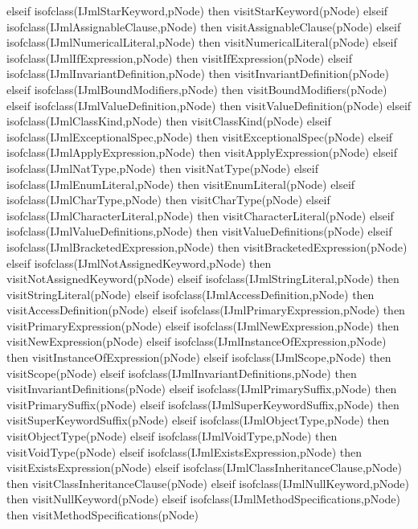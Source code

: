 \begin{vdm_al}
      elseif isofclass(IJmlStarKeyword,pNode) then visitStarKeyword(pNode)
      elseif isofclass(IJmlAssignableClause,pNode) then visitAssignableClause(pNode)
      elseif isofclass(IJmlNumericalLiteral,pNode) then visitNumericalLiteral(pNode)
      elseif isofclass(IJmlIfExpression,pNode) then visitIfExpression(pNode)
      elseif isofclass(IJmlInvariantDefinition,pNode) then visitInvariantDefinition(pNode)
      elseif isofclass(IJmlBoundModifiers,pNode) then visitBoundModifiers(pNode)
      elseif isofclass(IJmlValueDefinition,pNode) then visitValueDefinition(pNode)
      elseif isofclass(IJmlClassKind,pNode) then visitClassKind(pNode)
      elseif isofclass(IJmlExceptionalSpec,pNode) then visitExceptionalSpec(pNode)
      elseif isofclass(IJmlApplyExpression,pNode) then visitApplyExpression(pNode)
      elseif isofclass(IJmlNatType,pNode) then visitNatType(pNode)
      elseif isofclass(IJmlEnumLiteral,pNode) then visitEnumLiteral(pNode)
      elseif isofclass(IJmlCharType,pNode) then visitCharType(pNode)
      elseif isofclass(IJmlCharacterLiteral,pNode) then visitCharacterLiteral(pNode)
      elseif isofclass(IJmlValueDefinitions,pNode) then visitValueDefinitions(pNode)
      elseif isofclass(IJmlBracketedExpression,pNode) then visitBracketedExpression(pNode)
      elseif isofclass(IJmlNotAssignedKeyword,pNode) then visitNotAssignedKeyword(pNode)
      elseif isofclass(IJmlStringLiteral,pNode) then visitStringLiteral(pNode)
      elseif isofclass(IJmlAccessDefinition,pNode) then visitAccessDefinition(pNode)
      elseif isofclass(IJmlPrimaryExpression,pNode) then visitPrimaryExpression(pNode)
      elseif isofclass(IJmlNewExpression,pNode) then visitNewExpression(pNode)
      elseif isofclass(IJmlInstanceOfExpression,pNode) then visitInstanceOfExpression(pNode)
      elseif isofclass(IJmlScope,pNode) then visitScope(pNode)
      elseif isofclass(IJmlInvariantDefinitions,pNode) then visitInvariantDefinitions(pNode)
      elseif isofclass(IJmlPrimarySuffix,pNode) then visitPrimarySuffix(pNode)
      elseif isofclass(IJmlSuperKeywordSuffix,pNode) then visitSuperKeywordSuffix(pNode)
      elseif isofclass(IJmlObjectType,pNode) then visitObjectType(pNode)
      elseif isofclass(IJmlVoidType,pNode) then visitVoidType(pNode)
      elseif isofclass(IJmlExistsExpression,pNode) then visitExistsExpression(pNode)
      elseif isofclass(IJmlClassInheritanceClause,pNode) then visitClassInheritanceClause(pNode)
      elseif isofclass(IJmlNullKeyword,pNode) then visitNullKeyword(pNode)
      elseif isofclass(IJmlMethodSpecifications,pNode) then visitMethodSpecifications(pNode)

\end{vdm_al}

